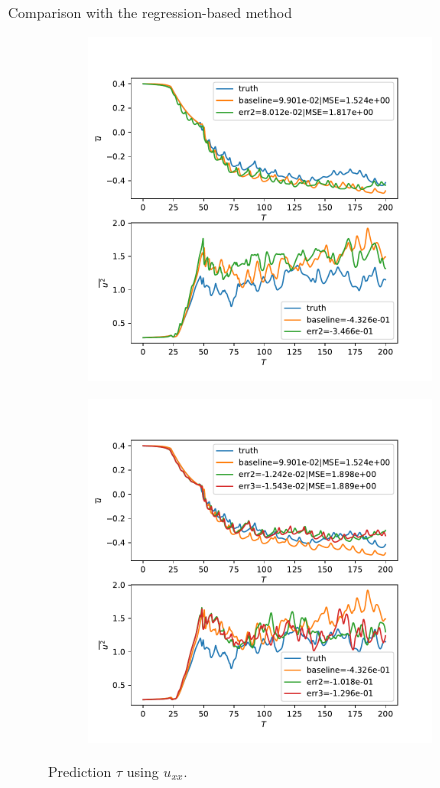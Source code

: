 \documentclass[paper slide]{beamer}
\begin{document}
\begin{frame}{Comparison with the regression-based method}
	\begin{figure}[ht]
		\centering
		\begin{subfigure}[b]{0.45\textwidth}
				\centering
				\includegraphics[width=\textwidth]
				{fig/ks_nu1_N1023n10_regression_cmp_stats.pdf}
				\caption{}
		\end{subfigure}
		\begin{subfigure}[b]{0.45\textwidth}
				\centering
				\includegraphics[width=\textwidth]
				{fig/ks_nu1_N1023n10_gaussian_cmp_stats.pdf}
				\caption{}
		\end{subfigure}
		\caption{Prediction $\tau$ using $u_{xx}$.}
		\label{fig:cmp_stats1}
	\end{figure}
\end{frame}
\end{document}

